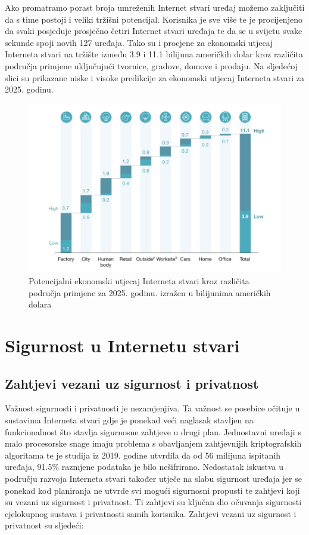 \documentclass[times, utf8, diplomski]{fer}
\begin{document}
Ako promatramo porast broja umreženih Internet stvari uređaj možemo zaključiti da s time postoji i veliki tržišni potencijal. Korisnika je sve više te je procijenjeno da svaki posjeduje prosječno četiri Internet stvari uređaja te da se u svijetu svake sekunde spoji novih 127 uređaja. Tako su i procjene za ekonomski utjecaj Interneta stvari na tržište između 3.9 i 11.1 bilijuna američkih dolar kroz različita područja primjene uključujući tvornice, gradove, domove i prodaju\citep{Patel2018Jan}. Na sljedećoj slici su prikazane niske i visoke predikcije za ekonomski utjecaj Interneta stvari za 2025. godinu.
\begin{figure}[H]
    \centering
    \includegraphics[width=12cm]{images/iot-economic-impact.png}
    \caption{Potencijalni ekonomski utjecaj Interneta stvari kroz različita područja primjene za 2025. godinu. izražen u bilijunima američkih dolara\citep{Patel2018Jan}}
    \label{fig:market}
\end{figure}

\chapter{Sigurnost u Internetu stvari}
\section{Zahtjevi vezani uz sigurnost i privatnost}
Važnost sigurnosti i privatnosti je nezamjenjiva. Ta važnost se posebice očituje u sustavima Interneta stvari gdje je ponekad veći naglasak stavljen na funkcionalnost što stavlja sigurnosne zahtjeve u drugi plan. Jednostavni uređaji s malo procesorske snage imaju problema s obavljanjem zahtjevnijih kriptografskih algoritama te je studija iz 2019. godine utvrdila da od 56 milijuna ispitanih uređaja, 91.5\% razmjene podataka je bilo nešifrirano\citep{Greene2019May}. Nedostatak iskustva u području razvoja Interneta stvari također utječe na slabu sigurnost uređaja jer se ponekad kod planiranja ne utvrde svi mogući sigurnosni propusti te zahtjevi koji su vezani uz sigurnost i privatnost. Ti zahtjevi su ključan dio očuvanja sigurnosti cjelokupnog sustava i privatnosti samih korisnika. Zahtjevi vezani uz sigurnost i privatnost su sljedeći\citep{InternetStvari}:
\end{document}
